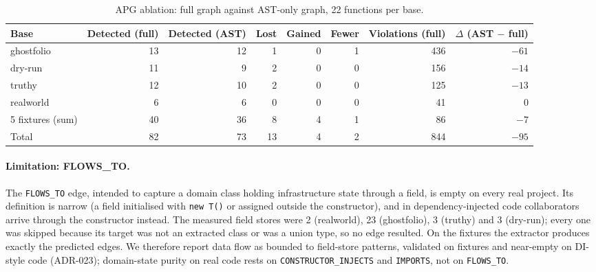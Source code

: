 \documentclass[10pt,a4paper]{article}
\newcommand{\edge}[1]{\texttt{\small #1}}
\begin{document}
\begin{table}[t]
\centering
\caption{APG ablation: full graph against AST-only graph, 22 functions per base.}
\label{tab:ablation}
\small
\begin{tabular}{@{}lrrrrrrr@{}}
\toprule
Base & Detected (full) & Detected (AST) & Lost & Gained & Fewer & Violations (full) & $\Delta$ (AST $-$ full) \\
\midrule
ghostfolio & 13 & 12 & 1 & 0 & 1 & 436 & $-61$ \\
dry-run & 11 & 9 & 2 & 0 & 0 & 156 & $-14$ \\
truthy & 12 & 10 & 2 & 0 & 0 & 125 & $-13$ \\
realworld & 6 & 6 & 0 & 0 & 0 & 41 & 0 \\
5 fixtures (sum) & 40 & 36 & 8 & 4 & 1 & 86 & $-7$ \\
\midrule
Total & 82 & 73 & 13 & 4 & 2 & 844 & $-95$ \\
\bottomrule
\end{tabular}
\end{table}

\paragraph{Limitation: FLOWS\_TO.}
The \edge{FLOWS\_TO} edge, intended to capture a domain class holding infrastructure state through a field, is empty
on every real project. Its definition is narrow (a field initialised with \texttt{new T()} or assigned outside the
constructor), and in dependency-injected code collaborators arrive through the constructor instead. The measured
field stores were 2 (realworld), 23 (ghostfolio), 3 (truthy) and 3 (dry-run); every one was skipped because its
target was not an extracted class or was a union type, so no edge resulted. %
On the fixtures the extractor produces exactly the predicted edges. We therefore report data flow as bounded to
field-store patterns, validated on fixtures and near-empty on DI-style code (ADR-023); domain-state purity on real
code rests on \edge{CONSTRUCTOR\_INJECTS} and \edge{IMPORTS}, not on \edge{FLOWS\_TO}.
\end{document}
